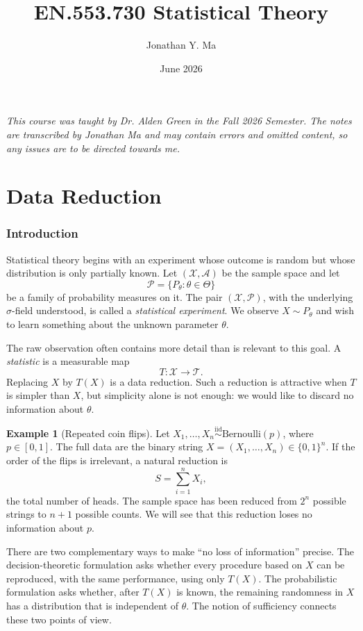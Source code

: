 \documentclass[12pt,oneside]{book}
\title{EN.553.730 Statistical Theory}
\author{Jonathan Y. Ma}
\date{June 2026}
\numberwithin{equation}{section}
\theoremstyle{definition}
\newtheorem{example}{Example}[section]
\theoremstyle{plain}
\theoremstyle{remark}
\newcommand{\iid}{\overset{\text{iid}}{\sim}}
\newcommand{\Bern}{\mathrm{Bernoulli}}
\begin{document}
\maketitle

\noindent \emph{This course was taught by Dr. Alden Green in the Fall 2026 Semester. The notes are transcribed by Jonathan Ma and may contain errors and omitted content, so any issues are to be directed towards me.}

\tableofcontents

\part{Data Reduction}

\section{Introduction}

Statistical theory begins with an experiment whose outcome is random but whose
distribution is only partially known.  Let
\((\mathcal X,\mathcal A)\) be the sample space and let
\[
    \mathcal P=\{P_\theta:\theta\in\Theta\}
\]
be a family of probability measures on it.  The pair
\((\mathcal X,\mathcal P)\), with the underlying $\sigma$-field understood, is
called a \emph{statistical experiment}.  We observe $X\sim P_\theta$ and wish
to learn something about the unknown parameter $\theta$.

The raw observation often contains more detail than is relevant to this goal.
A \emph{statistic} is a measurable map
\[
    T:\mathcal X\longrightarrow\mathcal T.
\]
Replacing $X$ by $T(X)$ is a data reduction.  Such a reduction is attractive
when $T$ is simpler than $X$, but simplicity alone is not enough: we would
like to discard no information about $\theta$.

\begin{example}[Repeated coin flips]
Let $X_1,\ldots,X_n\iid\Bern(p)$, where $p\in[0,1]$.  The full data are the
binary string $X=(X_1,\ldots,X_n)\in\{0,1\}^n$.  If the order of the flips is
irrelevant, a natural reduction is
\[
    S=\sum_{i=1}^n X_i,
\]
the total number of heads.  The sample space has been reduced from $2^n$
possible strings to $n+1$ possible counts.  We will see that this reduction
loses no information about $p$.
\end{example}

There are two complementary ways to make ``no loss of information'' precise.
The decision-theoretic formulation asks whether every procedure based on $X$
can be reproduced, with the same performance, using only $T(X)$.  The
probabilistic formulation asks whether, after $T(X)$ is known, the remaining
randomness in $X$ has a distribution that is independent of $\theta$.  The
notion of sufficiency connects these two points of view.
\end{document}
